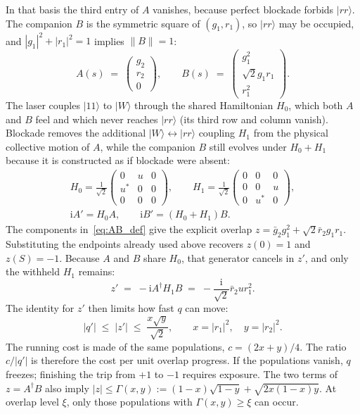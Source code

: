 \documentclass[aps,prx,reprint,nofootinbib,longbibliography,floatfix]{revtex4-2}
\theoremstyle{plain}
\theoremstyle{remark}
\newcommand{\ii}{\mathrm{i}}
\newcommand{\bket}[1]{|#1\rangle}
\begin{document}
In that basis the third entry of $A$ vanishes, because perfect blockade forbids $\bket{rr}$. The companion $B$ is the symmetric square of $(g_1,r_1)$, so $\bket{rr}$ may be occupied, and $|g_1|^2+|r_1|^2=1$ implies $\|B\|=1$:
\begin{equation}
A(s) \;=\; \begin{pmatrix} g_2 \\ r_2 \\ 0 \end{pmatrix},
\qquad
B(s) \;=\; \begin{pmatrix} g_1^2 \\ \sqrt{2}g_1 r_1 \\ r_1^2 \end{pmatrix}.
\label{eq:AB_def}
\end{equation}
The laser couples $\bket{11}$ to $\bket{W}$ through the shared Hamiltonian $H_0$, which both $A$ and $B$ feel and which never reaches $\bket{rr}$ (its third row and column vanish). Blockade removes the additional $\bket{W}\leftrightarrow\bket{rr}$ coupling $H_1$ from the physical collective motion of $A$, while the companion $B$ still evolves under $H_0+H_1$ because it is constructed as if blockade were absent:
\begin{equation}
\begin{gathered}
H_0 = \frac{1}{\sqrt{2}}\begin{pmatrix} 0 & u & 0 \\ u^* & 0 & 0 \\ 0 & 0 & 0 \end{pmatrix},
\qquad
H_1 = \frac{1}{\sqrt{2}}\begin{pmatrix} 0 & 0 & 0 \\ 0 & 0 & u \\ 0 & u^* & 0 \end{pmatrix},
\\
\ii A' = H_0 A,
\qquad
\ii B' = (H_0 + H_1) B.
\end{gathered}
\label{eq:H0_H1}
\end{equation}
The components in~\eqref{eq:AB_def} give the explicit overlap $z=\bar{g}_2 g_1^2+\sqrt{2}\bar{r}_2 g_1 r_1$. Substituting the endpoints already used above recovers $z(0)=1$ and $z(S)=-1$. Because $A$ and $B$ share $H_0$, that generator cancels in $z'$, and only the withheld $H_1$ remains:
\begin{equation}
z' \;=\; -\ii A^\dagger H_1 B \;=\; -\frac{\ii}{\sqrt{2}}\bar{r}_2 u r_1^2.
\label{eq:z_deriv}
\end{equation}
The identity for $z'$ then limits how fast $q$ can move:
\begin{equation}
|q'| \;\le\; |z'| \;\le\; \frac{x\sqrt{y}}{\sqrt{2}},
\qquad x = |r_1|^2,\quad y = |r_2|^2.
\label{eq:q_dot_bound}
\end{equation}
The running cost is made of the same populations, $c=(2x+y)/4$.
The ratio $c/|q'|$ is therefore the cost per unit overlap progress. If the populations vanish, $q$ freezes; finishing the trip from $+1$ to $-1$ requires exposure. The two terms of $z=A^\dagger B$ also imply $|z|\le\Gamma(x,y):=(1-x)\sqrt{1-y}+\sqrt{2x(1-x)y}$. At overlap level $\xi$, only those populations with $\Gamma(x,y)\ge\xi$ can occur.
\end{document}
